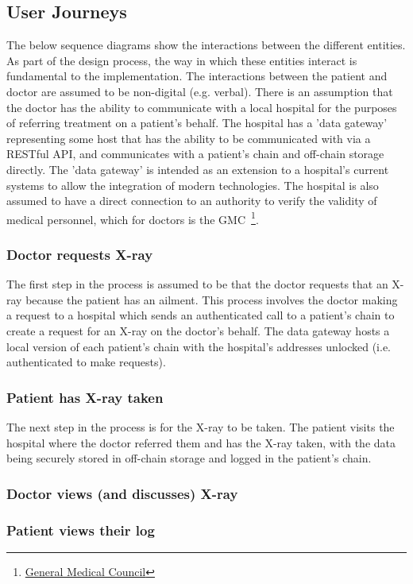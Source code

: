 \subsection{User Journeys}

The below sequence diagrams show the interactions between the different entities. As part of the design process, the way in which these entities interact is fundamental to the implementation. The interactions between the patient and doctor are assumed to be non-digital (e.g. verbal). There is an assumption that the doctor has the ability to communicate with a local hospital for the purposes of referring treatment on a patient's behalf. The hospital has a 'data gateway' representing some host that has the ability to be communicated with via a RESTful API, and communicates with a patient's chain and off-chain storage directly. The 'data gateway' is intended as an extension to a hospital's current systems to allow the integration of modern technologies. The hospital is also assumed to have a direct connection to an authority to verify the validity of medical personnel, which for doctors is the GMC~\footnote{\href{http://www.gmc-uk.org/}{General Medical Council}}.

\subsubsection{Doctor requests X-ray}

The first step in the process is assumed to be that the doctor requests that an X-ray because the patient has an ailment. This process involves the doctor making a request to a hospital which sends an authenticated call to a patient's chain to create a request for an X-ray on the doctor's behalf. The data gateway hosts a local version of each patient's chain with the hospital's addresses unlocked (i.e. authenticated to make requests).



\subsubsection{Patient has X-ray taken}

The next step in the process is for the X-ray to be taken. The patient visits the hospital where the doctor referred them and has the X-ray taken, with the data being securely stored in off-chain storage and logged in the patient's chain.



\subsubsection{Doctor views (and discusses) X-ray}



\subsubsection{Patient views their log}




